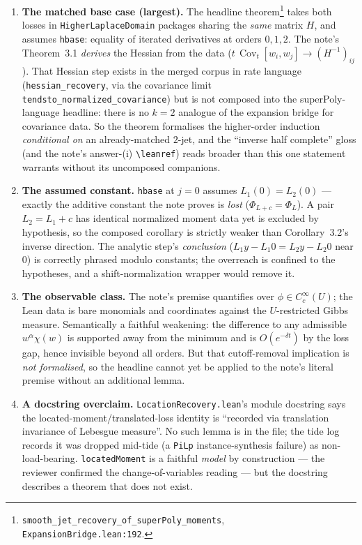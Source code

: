 \documentclass[11pt]{article}
\newcommand{\Cov}{\operatorname{Cov}}
\begin{document}
\begin{enumerate}[leftmargin=2em]
\item \textbf{The matched base case (largest).} The headline
theorem\footnote{\texttt{smooth\_jet\_recovery\_of\_superPoly\_moments},
\texttt{ExpansionBridge.lean:192}.} takes both losses in
\texttt{HigherLaplaceDomain} packages sharing the \emph{same} matrix $H$, and
assumes \texttt{hbase}: equality of iterated derivatives at orders $0,1,2$.
The note's Theorem~3.1 \emph{derives} the Hessian from the data ($t\,
\Cov_t[w_i,w_j] \to (H^{-1})_{ij}$). That Hessian step exists in the merged
corpus in rate language (\texttt{hessian\_recovery}, via the covariance
limit \texttt{tendsto\_normalized\_\allowbreak covariance}) but is not
composed into the superPoly-language
headline: there is no $k=2$ analogue of the expansion bridge for covariance
data. So the theorem formalises the higher-order induction \emph{conditional
on} an already-matched $2$-jet, and the ``inverse half complete'' gloss (and
the note's answer-(i) \verb|\leanref|) reads broader than this one statement
warrants without its uncomposed companions.
\item \textbf{The assumed constant.} \texttt{hbase} at $j=0$ assumes
$L_1(0)=L_2(0)$ --- exactly the additive constant the note proves is
\emph{lost} ($\Phi_{L+c}=\Phi_L$). A pair $L_2 = L_1 + c$ has identical
normalized moment data yet is excluded by hypothesis, so the composed
corollary is strictly weaker than Corollary~3.2's inverse direction. The
analytic step's \emph{conclusion} ($L_1 y - L_1 0 = L_2 y - L_2 0$ near $0$)
is correctly phrased modulo constants; the overreach is confined to the
hypotheses, and a shift-normalization wrapper would remove it.
\item \textbf{The observable class.} The note's premise quantifies over
$\phi \in C_c^\infty(U)$; the Lean data is bare monomials and coordinates
against the $U$-restricted Gibbs measure. Semantically a faithful weakening:
the difference to any admissible $w^\alpha\chi(w)$ is supported away from the
minimum and is $O(e^{-\delta t})$ by the loss gap, hence invisible beyond all
orders. But that cutoff-removal implication is \emph{not formalised}, so the
headline cannot yet be applied to the note's literal premise without an
additional lemma.
\item \textbf{A docstring overclaim.} \texttt{LocationRecovery.lean}'s module
docstring says the located-moment/translated-loss identity is ``recorded via
translation invariance of Lebesgue measure''. No such lemma is in the file;
the tide log records it was dropped mid-tide (a \texttt{PiLp}
instance-synthesis failure) as non-load-bearing. \texttt{locatedMoment} is a
faithful \emph{model} by construction --- the reviewer confirmed the
change-of-variables reading --- but the docstring describes a theorem that
does not exist.
\end{enumerate}
\end{document}
